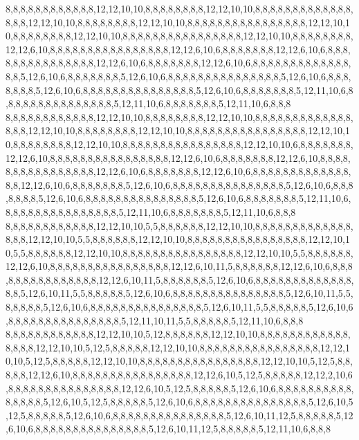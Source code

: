 8,8,8,8,8,8,8,8,8,8,8,8,12,12,10,10,8,8,8,8,8,8,8,8,12,12,10,10,8,8,8,8,8,8,8,8,8,8,8,8,8,8,8,8,12,12,10,10,8,8,8,8,8,8,8,8,12,12,10,10,8,8,8,8,8,8,8,8,8,8,8,8,8,8,8,8,12,12,10,10,8,8,8,8,8,8,8,8,12,12,10,10,8,8,8,8,8,8,8,8,8,8,8,8,8,8,8,8,12,12,10,10,8,8,8,8,8,8,8,8,12,12,6,10,8,8,8,8,8,8,8,8,8,8,8,8,8,8,8,8,12,12,6,10,6,8,8,8,8,8,8,8,12,12,6,10,6,8,8,8,8,8,8,8,8,8,8,8,8,8,8,8,12,12,6,10,6,8,8,8,8,8,8,8,12,12,6,10,6,8,8,8,8,8,8,8,8,8,8,8,8,8,8,8,5,12,6,10,6,8,8,8,8,8,8,8,5,12,6,10,6,8,8,8,8,8,8,8,8,8,8,8,8,8,8,8,5,12,6,10,6,8,8,8,8,8,8,8,5,12,6,10,6,8,8,8,8,8,8,8,8,8,8,8,8,8,8,8,5,12,6,10,6,8,8,8,8,8,8,8,5,12,11,10,6,8,8,8,8,8,8,8,8,8,8,8,8,8,8,8,5,12,11,10,6,8,8,8,8,8,8,8,5,12,11,10,6,8,8,8
8,8,8,8,8,8,8,8,8,8,8,8,12,12,10,10,8,8,8,8,8,8,8,8,12,12,10,10,8,8,8,8,8,8,8,8,8,8,8,8,8,8,8,8,12,12,10,10,8,8,8,8,8,8,8,8,12,12,10,10,8,8,8,8,8,8,8,8,8,8,8,8,8,8,8,8,12,12,10,10,8,8,8,8,8,8,8,8,12,12,10,10,8,8,8,8,8,8,8,8,8,8,8,8,8,8,8,8,12,12,10,10,6,8,8,8,8,8,8,8,12,12,6,10,8,8,8,8,8,8,8,8,8,8,8,8,8,8,8,8,12,12,6,10,6,8,8,8,8,8,8,8,12,12,6,10,8,8,8,8,8,8,8,8,8,8,8,8,8,8,8,8,12,12,6,10,6,8,8,8,8,8,8,8,12,12,6,10,6,8,8,8,8,8,8,8,8,8,8,8,8,8,8,8,12,12,6,10,6,8,8,8,8,8,8,8,5,12,6,10,6,8,8,8,8,8,8,8,8,8,8,8,8,8,8,8,5,12,6,10,6,8,8,8,8,8,8,8,5,12,6,10,6,8,8,8,8,8,8,8,8,8,8,8,8,8,8,8,5,12,6,10,6,8,8,8,8,8,8,8,5,12,11,10,6,8,8,8,8,8,8,8,8,8,8,8,8,8,8,8,5,12,11,10,6,8,8,8,8,8,8,8,5,12,11,10,6,8,8,8
8,8,8,8,8,8,8,8,8,8,8,8,12,12,10,10,5,5,8,8,8,8,8,8,12,12,10,10,8,8,8,8,8,8,8,8,8,8,8,8,8,8,8,8,12,12,10,10,5,5,8,8,8,8,8,8,12,12,10,10,8,8,8,8,8,8,8,8,8,8,8,8,8,8,8,8,12,12,10,10,5,5,8,8,8,8,8,8,12,12,10,10,8,8,8,8,8,8,8,8,8,8,8,8,8,8,8,8,12,12,10,10,5,5,8,8,8,8,8,8,12,12,6,10,8,8,8,8,8,8,8,8,8,8,8,8,8,8,8,8,12,12,6,10,11,5,8,8,8,8,8,8,12,12,6,10,6,8,8,8,8,8,8,8,8,8,8,8,8,8,8,8,12,12,6,10,11,5,8,8,8,8,8,8,5,12,6,10,6,8,8,8,8,8,8,8,8,8,8,8,8,8,8,8,5,12,6,10,11,5,5,8,8,8,8,8,5,12,6,10,6,8,8,8,8,8,8,8,8,8,8,8,8,8,8,8,5,12,6,10,11,5,5,8,8,8,8,8,5,12,6,10,6,8,8,8,8,8,8,8,8,8,8,8,8,8,8,8,5,12,6,10,11,5,5,8,8,8,8,8,5,12,6,10,6,8,8,8,8,8,8,8,8,8,8,8,8,8,8,8,5,12,11,10,11,5,5,8,8,8,8,8,5,12,11,10,6,8,8,8
8,8,8,8,8,8,8,8,8,8,8,8,12,12,10,10,5,12,8,8,8,8,8,8,12,12,10,10,8,8,8,8,8,8,8,8,8,8,8,8,8,8,8,8,12,12,10,10,5,12,5,8,8,8,8,8,12,12,10,10,8,8,8,8,8,8,8,8,8,8,8,8,8,8,8,8,12,12,10,10,5,12,5,8,8,8,8,8,12,12,10,10,8,8,8,8,8,8,8,8,8,8,8,8,8,8,8,8,12,12,10,10,5,12,5,8,8,8,8,8,12,12,6,10,8,8,8,8,8,8,8,8,8,8,8,8,8,8,8,8,12,12,6,10,5,12,5,8,8,8,8,8,12,12,2,10,6,8,8,8,8,8,8,8,8,8,8,8,8,8,8,8,12,12,6,10,5,12,5,8,8,8,8,8,5,12,6,10,6,8,8,8,8,8,8,8,8,8,8,8,8,8,8,8,5,12,6,10,5,12,5,8,8,8,8,8,5,12,6,10,6,8,8,8,8,8,8,8,8,8,8,8,8,8,8,8,5,12,6,10,5,12,5,8,8,8,8,8,5,12,6,10,6,8,8,8,8,8,8,8,8,8,8,8,8,8,8,8,5,12,6,10,11,12,5,8,8,8,8,8,5,12,6,10,6,8,8,8,8,8,8,8,8,8,8,8,8,8,8,8,5,12,6,10,11,12,5,8,8,8,8,8,5,12,11,10,6,8,8,8
